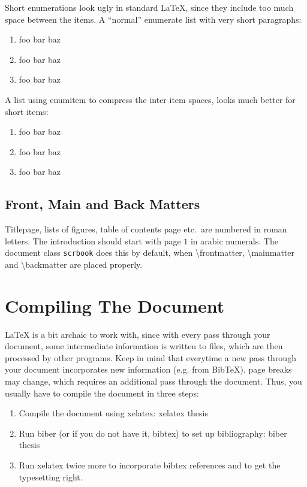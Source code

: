 \documentclass[../{{cookiecutter.project_slug}}.tex]{subfiles}
\begin{document}
    Short enumerations look ugly in  standard \LaTeX{}, since they include 
    too much  space between the  items.  A ``normal'' enumerate  list with 
    very short paragraphs:                                                 
    \begin{enumerate}
        \item foo bar baz
        \item foo bar baz
        \item foo bar baz
    \end{enumerate}

    A list using enumitem to compress the inter item spaces, looks much better for short items:
    \begin{enumerate}[noitemsep]
        \item foo bar baz
        \item foo bar baz
        \item foo bar baz
    \end{enumerate}

    \subsection{Front, Main and Back Matters}

    Titlepage, lists of figures, table of contents page etc.\ are numbered 
    in  roman letters.   The introduction  should start  with page  $1$ in 
    arabic  numerals.   The document  class  \verb+scrbook+  does this  by 
    default,  when \textbackslash  frontmatter, \textbackslash  mainmatter 
    and \textbackslash backmatter are placed properly.                     



    \section{Compiling The Document}
    \LaTeX{}  is  a bit  archaic  to  work  with,  since with  every  pass 
    through  your document,  some intermediate  information is  written to 
    files,  which are  then processed  by  other programs.   Keep in  mind 
    that  everytime a  new  pass through  your  document incorporates  new 
    information (e.g. from BibTeX), page breaks may change, which requires
    an  additional pass  through the  document. Thus, you  usually have  to
    compile the document in three steps:
    \begin{enumerate}
        \item Compile the document using xelatex: xelatex thesis
        \item Run biber  (or if  you do  not have  it, bibtex)  to set  up
              bibliography: biber thesis
        \item Run xelatex  twice more to incorporate  bibtex references and
              to get the typesetting right.
    \end{enumerate}
\end{document}
